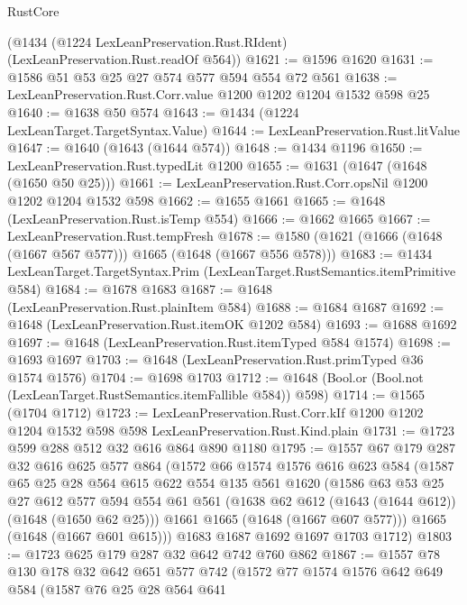 \begin{lexlean}{RustCore}
\begin{coremodule}
    (@1434 (@1224 LexLeanPreservation.Rust.RIdent) (LexLeanPreservation.Rust.readOf @564))
@1621 := @1596 @1620
@1631 := @1586 @51 @53 @25 @27 @574 @577 @594 @554 @72 @561
@1638 := LexLeanPreservation.Rust.Corr.value @1200 @1202 @1204 @1532 @598 @25
@1640 := @1638 @50 @574
@1643 := @1434 (@1224 LexLeanTarget.TargetSyntax.Value)
@1644 := LexLeanPreservation.Rust.litValue
@1647 := @1640 (@1643 (@1644 @574))
@1648 := @1434 @1196
@1650 := LexLeanPreservation.Rust.typedLit @1200
@1655 := @1631 (@1647 (@1648 (@1650 @50 @25)))
@1661 := LexLeanPreservation.Rust.Corr.opsNil @1200 @1202 @1204 @1532 @598
@1662 := @1655 @1661
@1665 := @1648 (LexLeanPreservation.Rust.isTemp @554)
@1666 := @1662 @1665
@1667 := LexLeanPreservation.Rust.tempFresh
@1678 := @1580 (@1621 (@1666 (@1648 (@1667 @567 @577))) @1665 (@1648 (@1667 @556 @578)))
@1683 := @1434 LexLeanTarget.TargetSyntax.Prim (LexLeanTarget.RustSemantics.itemPrimitive @584)
@1684 := @1678 @1683
@1687 := @1648 (LexLeanPreservation.Rust.plainItem @584)
@1688 := @1684 @1687
@1692 := @1648 (LexLeanPreservation.Rust.itemOK @1202 @584)
@1693 := @1688 @1692
@1697 := @1648 (LexLeanPreservation.Rust.itemTyped @584 @1574)
@1698 := @1693 @1697
@1703 := @1648 (LexLeanPreservation.Rust.primTyped @36 @1574 @1576)
@1704 := @1698 @1703
@1712 := @1648 (Bool.or (Bool.not (LexLeanTarget.RustSemantics.itemFallible @584)) @598)
@1714 := @1565 (@1704 @1712)
@1723 := LexLeanPreservation.Rust.Corr.kIf
    @1200
    @1202
    @1204
    @1532
    @598
    @598
    LexLeanPreservation.Rust.Kind.plain
@1731 := @1723 @599 @288 @512 @32 @616 @864 @890 @1180
@1795 := @1557
    @67
    @179
    @287
    @32
    @616
    @625
    @577
    @864
    (@1572
      @66
      @1574
      @1576
      @616
      @623
      @584
      (@1587
        @65
        @25
        @28
        @564
        @615
        @622
        @554
        @135
        @561
        @1620
        (@1586
          @63
          @53
          @25
          @27
          @612
          @577
          @594
          @554
          @61
          @561
          (@1638 @62 @612 (@1643 (@1644 @612)) (@1648 (@1650 @62 @25)))
          @1661
          @1665
          (@1648 (@1667 @607 @577)))
        @1665
        (@1648 (@1667 @601 @615)))
      @1683
      @1687
      @1692
      @1697
      @1703
      @1712)
@1803 := @1723 @625 @179 @287 @32 @642 @742 @760 @862
@1867 := @1557
    @78
    @130
    @178
    @32
    @642
    @651
    @577
    @742
    (@1572
      @77
      @1574
      @1576
      @642
      @649
      @584
      (@1587
        @76
        @25
        @28
        @564
        @641

\end{coremodule}
\end{lexlean}
